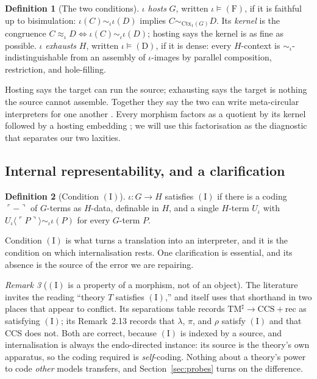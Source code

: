 \documentclass[11pt,a4paper]{article}
\theoremstyle{definition}
\newtheorem{definition}{Definition}[section]
\theoremstyle{plain}
\theoremstyle{remark}
\newtheorem{remark}[definition]{Remark}
\newcommand{\CtxC}{\mathrm{Ctx}}
\newcommand{\rhoc}{\rho}
\newcommand{\CCSrec}{\mathrm{CCS}{+}\mathrm{rec}}
\newcommand{\Fcond}{(\mathrm{F})}
\newcommand{\Dcond}{(\mathrm{D})}
\newcommand{\Icond}{(\mathrm{I})}
\begin{document}
\begin{definition}[The two conditions]
\label{def:conditions}
$\iota$ \emph{hosts} $G$, written $\iota \models \Fcond$, if it is faithful up to bisimulation:
$\iota(C) \sim_\iota \iota(D)$ implies $C \sim_{\CtxC_1(G)} D$. Its \emph{kernel} is the congruence
$C \approx_\iota D \iff \iota(C) \sim_\iota \iota(D)$; hosting says the kernel is as fine as
possible. $\iota$ \emph{exhausts} $H$, written $\iota \models \Dcond$, if it is dense: every
$H$-context is $\sim_\iota$-indistinguishable from an assembly of $\iota$-images by parallel
composition, restriction, and hole-filling.
\end{definition}

Hosting says the target can run the source; exhausting says the target is nothing the source cannot
assemble. Together they say the two can write meta-circular interpreters for one another
\cite[Cor.~6.4]{probe}. Every morphism factors as a quotient by its kernel followed by a hosting
embedding \cite[Prop.~4.11]{probe}; we will use this factorisation as the diagnostic that separates
our two laxities.

\subsection{Internal representability, and a clarification}

\begin{definition}[Condition $\Icond$]
\label{def:I}
$\iota : G \to H$ satisfies $\Icond$ if there is a coding $\ulcorner - \urcorner$ of $G$-terms as
$H$-data, definable in $H$, and a single $H$-term $U_\iota$ with
$U_\iota\langle \ulcorner P \urcorner \rangle \sim_\iota \iota(P)$ for every $G$-term $P$.
\end{definition}

Condition $\Icond$ is what turns a translation into an interpreter, and it is the condition on which
internalisation rests. One clarification is essential, and its absence is the source of the error
we are repairing.

\begin{remark}[$\Icond$ is a property of a morphism, not of an object]
\label{rmk:I-relative}
The literature invites the reading ``theory $T$ satisfies $\Icond$,'' and \cite{probe} itself uses
that shorthand in two places that appear to conflict. Its separations table records
$\mathrm{TM}^\sharp \to \CCSrec$ as satisfying $\Icond$; its Remark~2.13 records that $\lambda$,
$\pi$, and $\rhoc$ satisfy $\Icond$ and that CCS does not. Both are correct, because $\Icond$ is
indexed by a source, and internalisation is always the endo-directed instance: its source is the
theory's own apparatus, so the coding required is \emph{self}-coding. Nothing about a theory's power
to code \emph{other} models transfers, and Section~\ref{sec:probes} turns on the difference.
\end{remark}
\end{document}
